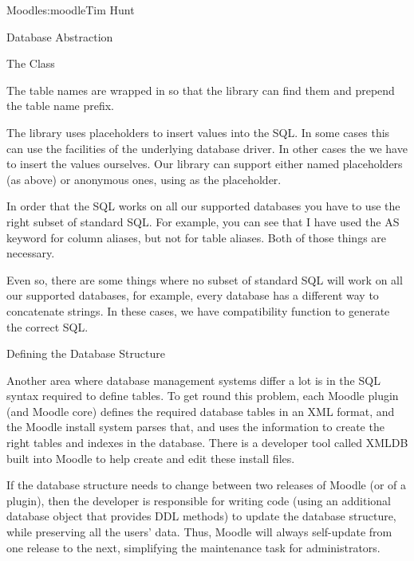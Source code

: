 \begin{aosachapter}{Moodle}{s:moodle}{Tim Hunt}
\begin{aosasect1}{Database Abstraction}
\begin{aosasect2}{The  Class}
\begin{aosaenumerate}

\item The table names are wrapped in \code{\{\}} so that the library
  can find them and prepend the table name prefix.

\item The library uses placeholders to insert values into the SQL. In
  some cases this can use the facilities of the underlying database
  driver. In other cases the we have to insert the values
  ourselves. Our library can support either named placeholders (as
  above) or anonymous ones, using  as the placeholder.

\item In order that the SQL works on all our supported databases you
  have to use the right subset of standard SQL. For example, you can
  see that I have used the AS keyword for column aliases, but not for
  table aliases. Both of those things are necessary.

\item Even so, there are some things where no subset of standard SQL
  will work on all our supported databases, for example, every
  database has a different way to concatenate strings. In these cases,
  we have compatibility function to generate the correct SQL.

\end{aosaenumerate}

\end{aosasect2}

\begin{aosasect2}{Defining the Database Structure}

Another area where database management systems differ a lot is in the
SQL syntax required to define tables. To get round this problem, each
Moodle plugin (and Moodle core) defines the required database tables
in an XML format, and the Moodle install system parses that, and uses
the information to create the right tables and indexes in the
database. There is a developer tool called XMLDB built into Moodle to
help create and edit these install files.

If the database structure needs to change between two releases of
Moodle (or of a plugin), then the developer is responsible for writing
code (using an additional database object that provides DDL methods)
to update the database structure, while preserving all the users'
data. Thus, Moodle will always self-update from one release to the
next, simplifying the maintenance task for administrators.


\end{aosasect2}
\end{aosasect1}
\end{aosachapter}
